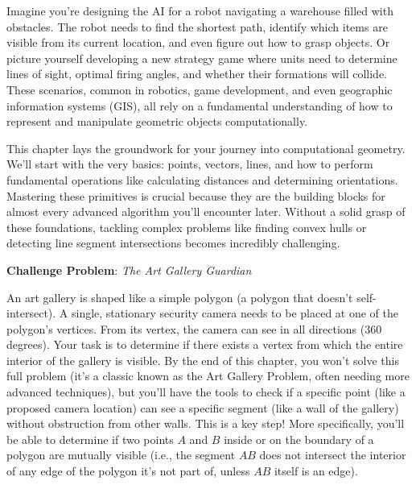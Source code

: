 \begin{chapterintro}
\label{intro:geometry_primitives}
Imagine you're designing the AI for a robot navigating a warehouse filled with obstacles. The robot needs to find the shortest path, identify which items are visible from its current location, and even figure out how to grasp objects. Or picture yourself developing a new strategy game where units need to determine lines of sight, optimal firing angles, and whether their formations will collide. These scenarios, common in robotics, game development, and even geographic information systems (GIS), all rely on a fundamental understanding of how to represent and manipulate geometric objects computationally.

This chapter lays the groundwork for your journey into computational geometry. We'll start with the very basics: points, vectors, lines, and how to perform fundamental operations like calculating distances and determining orientations. Mastering these primitives is crucial because they are the building blocks for almost every advanced algorithm you'll encounter later. Without a solid grasp of these foundations, tackling complex problems like finding convex hulls or detecting line segment intersections becomes incredibly challenging.

\textbf{Challenge Problem}: \textit{The Art Gallery Guardian}

An art gallery is shaped like a simple polygon (a polygon that doesn't self-intersect). A single, stationary security camera needs to be placed at one of the polygon's vertices. From its vertex, the camera can see in all directions (360 degrees). Your task is to determine if there exists a vertex from which the entire interior of the gallery is visible. By the end of this chapter, you won't solve this full problem (it's a classic known as the Art Gallery Problem, often needing more advanced techniques), but you'll have the tools to check if a specific point (like a proposed camera location) can see a specific segment (like a wall of the gallery) without obstruction from other walls. This is a key step! More specifically, you'll be able to determine if two points $A$ and $B$ inside or on the boundary of a polygon are mutually visible (i.e., the segment $AB$ does not intersect the interior of any edge of the polygon it's not part of, unless $AB$ itself is an edge).
\end{chapterintro}
